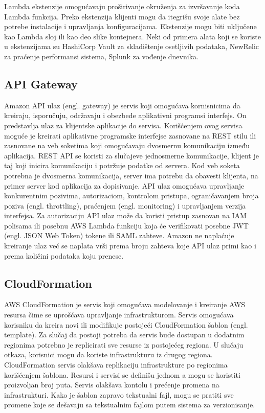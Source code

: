 \documentclass[12pt,oneside]{memoir}
\begin{document}
Lambda ekstenzije omogućavaju proširivanje okruženja za izvršavanje koda Lambda funkcija. Preko ekstenzija klijenti mogu da itegrišu svoje alate bez potrebe instalacije i upravljanja konfiguracijama. Ekstenzije mogu biti uključene kao Lambda sloj ili kao deo slike kontejnera. Neki od primera alata koji se koriste u ekstenzijama su HashiCorp Vault za skladištenje osetljivih podataka, NewRelic za praćenje performansi sistema, Splunk za vođenje dnevnika.

\subsection{API Gateway}
 
Amazon API ulaz (engl. gateway) je servis koji omogućava kornisnicima da kreiraju, isporučuju, održavaju i obezbede aplikativni programsi interfejs. On predstavlja ulaz za klijentske aplikacije do servisa. Korišćenjem ovog servisa moguće je kreirati aplikativne programske interfejse zasnovane na REST stilu ili zasnovane na veb soketima koji omogućavaju dvosmernu komunikaciju između aplikacija. REST API se koristi za slučajeve jednosmerne komunikacije, klijent je taj koji inicira komunikaciju i potržuje podatke od servera. Kod veb soketa potrebna je dvosmerna komunikacija, server ima potrebu da obavesti klijenta, na primer server kod aplikacija za dopisivanje. API ulaz omogućava upravljanje konkurentnim pozivima, autorizaciom, kontrolom pristupa, ograničavanjem broja poziva (engl. throttling), praćenjem (engl. monitoring) i upravljanjem verzija interfejsa. Za autorizaciju API ulaz može da koristi pristup zasnovan na IAM polisama ili posebnu AWS Lambda funkciju koja će verifikovati posebne JWT (engl. JSON Web Token) tokene ili SAML zahteve. Amazon ne naplaćuje kreiranje ulaz već se naplata vrši prema broju zahteva koje API ulaz primi kao i prema količini podataka koju prenese. 
 
\subsection{CloudFormation}
 
AWS CloudFormation je servis koji omogućava modelovanje i kreiranje AWS resursa čime se uprošćava upravljanje infrastrukturom. Servis omogućava korisniku da kreira novi ili modifikuje postojeći CloudFormation šablon (engl. template). Za slučaj da postoji potreba da servis bude dostupan u dodatnim regionima potrebno je replicirati sve resurse iz postojećeg regiona. U slučaju otkaza, korisnici mogu da koriste infrastrukturu iz drugog regiona. CloudFormation servis olakšava replikaciju infrastrukture po regionima korišćenjem šablona. Resursi i servisi se definišu jednom a mogu se koristiti proizvoljan broj puta. Servis olakšava kontolu i prećenje promena na infrastrukturi. Kako je šablon zapravo tekstualni fajl, mogu se pratiti sve promene koje se dešavaju sa tekstualnim fajlom putem sistema za verzionisanje.
 
\end{document}
